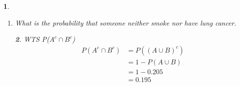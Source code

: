 \documentclass[11pt]{article}
\newtheorem*{solution}{\framebox{Sol}}
\newtheorem{example}{\framebox{Ex}}[section]
\begin{document}
\begin{example}
\begin{enumerate}
\begin{solution}
                            \begin{align*}
                                P(A\cap B^c)&= P(A) - P(A\cap B) \tag{thm 3} \\
                                            &=0.2 - 0.005\\
                                            &=0.195
                            \end{align*}
                        \end{solution}
                    \item What is the probability that someone neither smoke nor have lung cancer. 
                        \begin{solution}
                            WTS P($A^c \cap B^c$)
                            \begin{align*}
                                P(A^c \cap B^c) &= P((A\cup B)^c) \tag{De Morgan's Law}\\
                                                &=1-P(A \cup B) \tag{thm 1}\\
                                                &=1-0.205\\
                                                &=0.195
                            \end{align*}
                        \end{solution}
                \end{enumerate}
            \end{example}
\end{document}
